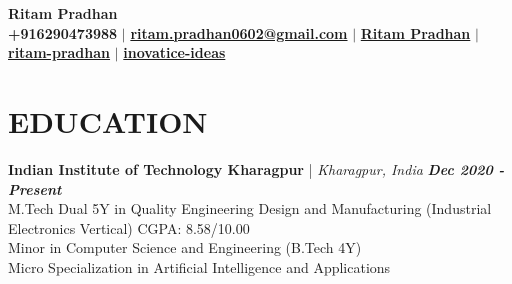 \documentclass[a4paper,9pt]{extarticle}
\begin{document}
\pagestyle{fancy}
\renewcommand{\headrulewidth}{0pt}
\fancyhead{}
\thispagestyle{empty} %

\begin{center}
    \vspace{-0.8cm}
    \textbf{\huge Ritam Pradhan} \\ \vspace{2pt}
    \faPhone*
    \small \textbf{+916290473988} $\mid$
    \textbf{\href{mailto:ritam.pradhan2002@gmail.com}{ritam.pradhan0602@gmail.com}} $\mid$
    \faGraduationCap
    \textbf{\href{https://scholar.google.com/citations?user=2rvQymgAAAAJ&hl=en}{Ritam Pradhan}} 
    $\mid$
    \textbf{\href{https://www.linkedin.com/in/ritam-pradhan/}{ritam-pradhan}} 
    $\mid$
    \textbf{\href{https://github.com/inovatice-ideas}{inovatice-ideas}}
\end{center}

\section*{EDUCATION}
\vspace{-0.2cm}
\noindent
\textbf{Indian Institute of Technology Kharagpur} | \textit{Kharagpur, India} \hfill \textbf{\textit{Dec 2020 - Present}}\\ %
M.Tech Dual 5Y in Quality Engineering Design and Manufacturing (Industrial Electronics Vertical) \hfill CGPA: 8.58/10.00 \\ %
Minor in Computer Science and Engineering (B.Tech 4Y) \\
Micro Specialization in Artificial Intelligence and Applications \\ 
\vspace{-0.5cm}

\end{document}
